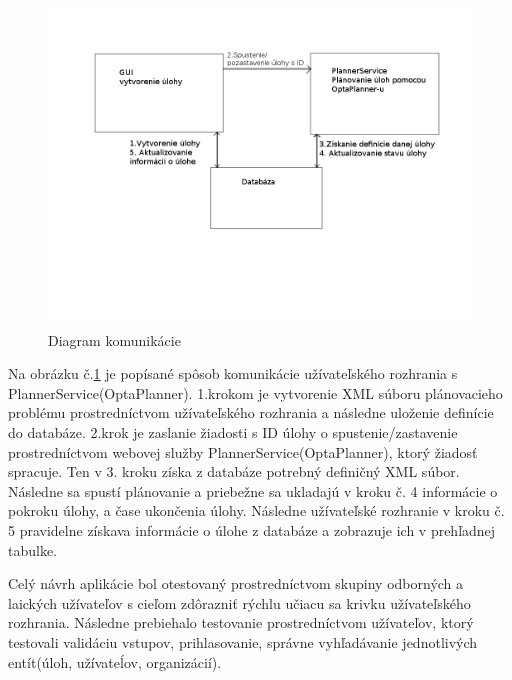 \begin{figure}[htb]

\begin{center}

\includegraphics[scale=0.4]{work.jpg} 
\caption{Diagram komunikácie}
\label{work}

\end{center}

\end{figure}
Na obrázku č.\ref{work} je popísané spôsob komunikácie užívateľského rozhrania s PlannerService(OptaPlanner). 1.krokom je vytvorenie XML súboru plánovacieho problému prostredníctvom užívateľského rozhrania a následne uloženie definície do databáze. 2.krok je zaslanie žiadosti s ID úlohy o spustenie/zastavenie prostredníctvom webovej služby PlannerService(OptaPlanner), ktorý žiadosť spracuje. Ten v 3. kroku získa z databáze potrebný definičný XML súbor. Následne sa spustí plánovanie a priebežne sa ukladajú v kroku č. 4 informácie o pokroku úlohy, a čase ukončenia úlohy. Následne užívateľské rozhranie v kroku č. 5 pravidelne získava informácie o úlohe z databáze a zobrazuje ich v prehľadnej tabulke.

Celý návrh aplikácie bol otestovaný prostredníctvom skupiny odborných a laických užívateľov s cieľom zdôrazniť rýchlu učiacu sa krivku užívateľského rozhrania. Následne prebiehalo testovanie prostredníctvom užívateľov, ktorý testovali validáciu vstupov, prihlasovanie, správne vyhľadávanie jednotlivých entít(úloh, užívateĺov, organizácií).

